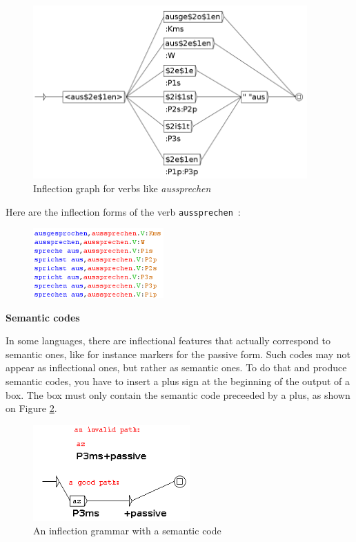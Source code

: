 \bigskip
\begin{figure}[!ht]
\begin{center}
\includegraphics[width=10.5cm]{resources/img/fig3-Advanced_operators_with_Variables-V_aussprechen.png}
\caption{Inflection graph for verbs like {\it aussprechen}
\label{fig-inflection-aussprechen}}
\end{center}
\end{figure}

\noindent Here are the inflection forms of the verb \verb+aussprechen+~:
\bigskip
\begin{figure}[!ht]
\begin{center}
\includegraphics[width=5cm]{resources/img/fig3-flexion_aussprechen2.png}
\end{center}
\end{figure}

\bigskip
\noindent \textbf{Semantic codes}

\noindent In some languages, there are inflectional features that actually correspond to 
semantic ones, like for instance markers for the passive form. Such codes may not appear
as inflectional ones, but rather as semantic ones. To do that and produce semantic codes, 
you have to insert a plus sign at the beginning of the output of a box. The box must only 
contain the semantic code preceeded by a plus, as shown on Figure \ref{fig-inflection-sem}.

\bigskip
\begin{figure}[!ht]
\begin{center}
\includegraphics[width=6cm]{resources/img/fig3-9sem.png}
\caption{An inflection grammar with a semantic code\label{fig-inflection-sem}}
\end{center}
\end{figure}

